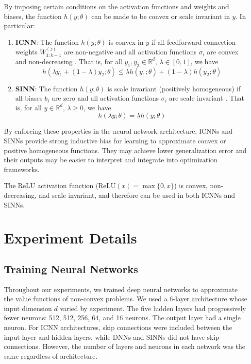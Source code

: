 \documentclass[10pt]{article} %
\theoremstyle{plain}
\theoremstyle{definition}
\theoremstyle{remark}
\begin{document}
By imposing certain conditions on the activation functions and weights and biases, the function $h(y;\theta)$ can be made to be convex or scale invariant in $y$. In particular:
\begin{enumerate}
    \item \textbf{ICNN}: The function $h(y;\theta)$ is convex in $y$ if all feedforward connection weights $W_{1: k-1}^{(z)}$ are non-negative and all activation functions $\sigma_i$ are convex and non-decreasing \citep{pmlr-v70-amos17b}. That is, for all $y_1, y_2 \in \mathbb{R}^d$, $\lambda \in [0, 1]$, we have \[
    h(\lambda y_1 + (1 - \lambda) y_2; \theta) \leq \lambda h(y_1; \theta) + (1 - \lambda) h(y_2; \theta) \]
    \item \textbf{SINN}: The function $h(y;\theta)$ is scale invariant (positively homogeneous) if all biases $b_i$ are zero and all activation functions $\sigma_i$ are scale invariant \citep{bamberger2025approximating}. That is, for all $y \in \mathbb{R}^d$, $\lambda \geq 0$, we have \[h(\lambda y; \theta) = \lambda h(y; \theta)\]
\end{enumerate}

By enforcing these properties in the neural network architecture, ICNNs and SINNs provide strong inductive bias for learning to approximate convex or positive homogeneous functions. They may achieve lower generalization error and their outputs may be easier to interpret and integrate into optimization frameworks.

The ReLU activation function ($\text{ReLU}(x) = \max \{0, x\}$) is convex, non-decreasing, and scale invariant, and therefore can be used in both ICNNs and SINNs.

\section{Experiment Details} \label{sec:experiments-details}

\subsection{Training Neural Networks}

Throughout our experiments, we trained deep neural networks to approximate the value functions of non-convex problems. We used a 6-layer architecture whose input dimension $d$ varied by experiment. The five hidden layers had progressively fewer neurons: 512, 512, 256, 64, and 16 neurons. The output layer had a single neuron. For ICNN architectures, skip connections were included between the input layer and hidden layers, while DNNs and SINNs did not have skip connections. However, the number of layers and neurons in each network was the same regardless of architecture.
\end{document}
